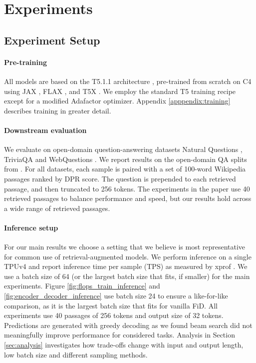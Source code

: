 \section{Experiments}
\label{section:experiments}

\subsection{Experiment Setup}
\label{section:experiment_setup}

\paragraph{Pre-training} All models are based on the T5.1.1 architecture \citep{t5}, pre-trained from scratch on C4 \citep{c4} using JAX \citep{jax}, FLAX \citep{flax}, and T5X \citep{t5x}. We employ the standard T5 training recipe except for a modified Adafactor \citep{adafactor} optimizer. Appendix \ref{apppendix:training} describes training in greater detail. 

\paragraph{Downstream evaluation}

We evaluate \modelname on open-domain question-answering datasets Natural Questions \citep{nq}, TriviaQA \citep{triviaqa} and WebQuestions \citep{webquestions}. We report results on the open-domain QA splits from \citet{orqa}. For all datasets, each sample is paired with a set of 100-word Wikipedia passages ranked by DPR \citep{dpr} score. The question is prepended to each retrieved passage, and then truncated to 256 tokens. The experiments in the paper use 40 retrieved passages to balance performance and speed, but our results hold across a wide range of retrieved passages.

\paragraph{Inference setup}

For our main results we choose a setting that we believe is most representative for common use of retrieval-augmented models. We perform inference on a single TPUv4 and report inference time per sample (TPS) as measured by xprof \citep{xprof}. We use a batch size of 64 (or the largest batch size that fits, if smaller) for the main experiments. Figure \ref{fig:flops_train_inference} and \ref{fig:encoder_decoder_inference} use batch size 24 to ensure a like-for-like comparison, as it is the largest batch size that fits for vanilla FiD. All experiments use 40 passages of 256 tokens and output size of 32 tokens. Predictions are generated with greedy decoding as we found beam search did not meaningfully improve performance for considered tasks. Analysis in Section \ref{sec:analysis} investigates how trade-offs change with input and output length, low batch size and different sampling methods.

